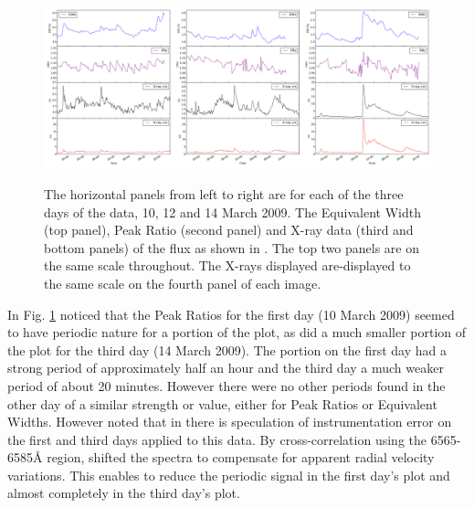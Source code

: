 \begin{figure}[!htbp]
\begin{center}
\includegraphics[scale=0.18]{Figures/uvrx-onepic.png} \\
\end{center}   
\caption{The horizontal panels from left to right are for each of the three days of the {\uves} data, 10, 12 and 14
  March 2009.  The Equivalent Width (top panel), Peak Ratio (second panel) and X-ray data (third and bottom panels) of the
  {\ha} flux as shown in \citet[Fig. 1 to Fig.3]{fuhrmeister11}. The top two panels are on the same scale
  throughout. The X-rays displayed are-displayed to the same scale on the fourth panel of each image.}
 \protect\label{fig:uvrxp1}
\end{figure}

In Fig. \ref{fig:uvrxp1} {\Firstp} noticed that the Peak Ratios for the first day (10 March 2009) seemed to have periodic nature for a portion of
the plot, as did a much smaller portion of the plot for the third day (14 March 2009). The portion on the first day had
a strong period of approximately half an hour and the third day a much weaker period of about 20 minutes.  However there
were no other periods found in the other day of a similar strength or value, either for Peak Ratios or Equivalent
Widths. However {\Firstp} noted that in \citet[Section 4.1]{barnes14} there is speculation of instrumentation error on
the first and third days applied to this data. By cross-correlation using the 6565-6585{\AA} region, {\Firstp} shifted
the spectra to compensate for apparent radial velocity variations. This enables {\Firstobj} to reduce the periodic
signal in the first day's plot and almost completely in the third day's plot.


